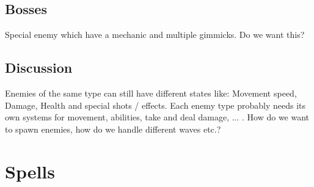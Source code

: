 \documentclass[12pt]{article}
\begin{document}
\subsection{Bosses}
Special enemy which have a mechanic and multiple gimmicks.
Do we want this? 

\subsection{Discussion}
Enemies of the same type can still have different states like: Movement speed, Damage, Health and special shots / effects. 
Each enemy type probably needs its own systems for movement, abilities, take and deal damage, ... .  
How do we want to spawn enemies, how do we handle different waves etc.? 


\newpage
\section{Spells}
\end{document}
